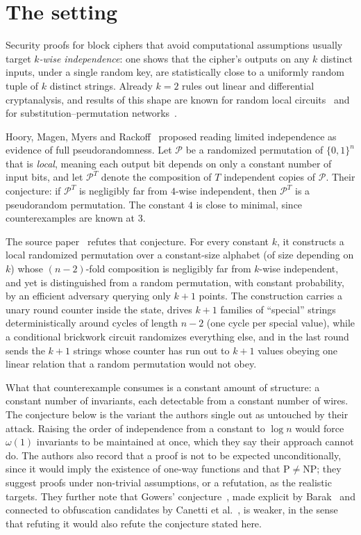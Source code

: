 \documentclass{aicr-conjecture}
\newcommand{\bits}{\{0,1\}}
\newcommand{\cP}{\mathcal{P}}
\begin{document}
\section{The setting}\label{sec:setting}

Security proofs for block ciphers that avoid computational assumptions
usually target \emph{$k$-wise independence}: one shows that the cipher's
outputs on any $k$ distinct inputs, under a single random key, are
statistically close to a uniformly random tuple of $k$ distinct strings.
Already $k = 2$ rules out linear and differential cryptanalysis, and
results of this shape are known for random local
circuits~\cite{Gow96,BH08,GHP25,GHKO25} and for
substitution--permutation networks~\cite{LTV21}.

Hoory, Magen, Myers and Rackoff~\cite{HMMR04,HMMR05} proposed reading
limited independence as evidence of full pseudorandomness. Let $\cP$ be
a randomized permutation of $\bits^n$ that is \emph{local}, meaning each
output bit depends on only a constant number of input bits, and let
$\cP^{T}$ denote the composition of $T$ independent copies of $\cP$.
Their conjecture: if $\cP^{T}$ is negligibly far from $4$-wise
independent, then $\cP^{T}$ is a pseudorandom permutation. The constant
$4$ is close to minimal, since counterexamples are known at $3$.

The source paper~\cite{DPT26} refutes that conjecture. For every
constant $k$, it constructs a local randomized permutation over a
constant-size alphabet (of size depending on $k$) whose $(n-2)$-fold
composition is negligibly far from $k$-wise independent, and yet is
distinguished from a random permutation, with constant probability, by
an efficient adversary querying only $k+1$ points. The construction
carries a unary round counter inside the state, drives $k+1$ families of
``special'' strings deterministically around cycles of length $n-2$ (one
cycle per special value), while a conditional brickwork circuit
randomizes everything else, and in the last round sends the $k+1$
strings whose counter has run out to $k+1$ values obeying one linear
relation that a random permutation would not obey.

What that counterexample consumes is a constant amount of structure: a
constant number of invariants, each detectable from a constant number of
wires. The conjecture below is the variant the authors single out as
untouched by their attack. Raising the order of independence from a
constant to $\log n$ would force $\omega(1)$ invariants to be maintained
at once, which they say their approach cannot do. The authors also
record that a proof is not to be expected unconditionally, since it
would imply the existence of one-way functions and that
$\mathrm{P} \neq \mathrm{NP}$; they suggest proofs under non-trivial
assumptions, or a refutation, as the realistic targets. They further
note that Gowers' conjecture~\cite{Gow96}, made explicit by
Barak~\cite{Bar17} and connected to obfuscation candidates by Canetti et
al.~\cite{CCMR24}, is weaker, in the sense that refuting it would also
refute the conjecture stated here.
\end{document}
